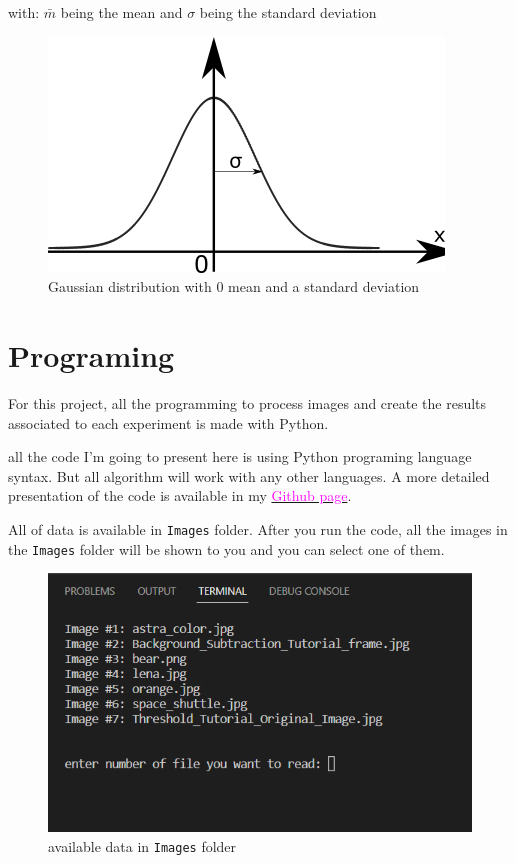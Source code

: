 \documentclass[12pt]{article}
\begin{document}
	with:‌ $\bar{m}$ being the mean and $\sigma$ being the standard deviation
	
	\begin{figure}[h]
		\centering
		\includegraphics[width=.7\textwidth]{images/4}
		\caption{Gaussian distribution with 0 mean and a standard deviation}
		\label{fig:fig3}
	\end{figure}

\section{Programing}
For this project, all the programming to process images and create the results associated to each experiment is made with Python.

all the code I'm going to present here is using Python programing language syntax. But all algorithm will work with any other languages. A more detailed presentation of the code is available in my \href{https://github.com/rezaAdinepour/Histogram-Equalization.git}{\textcolor{magenta}{Github page}}.

All of data is available in \texttt{Images} folder. After you run the code, all the images  in the \texttt{Images} folder will be shown to you and you can select one of them.

\begin{figure}[h]
	\centering
	\includegraphics[width=.7\textwidth]{images/5}
	\caption{available data in \texttt{Images} folder}
	\label{fig:fig4}
\end{figure}
\end{document}
